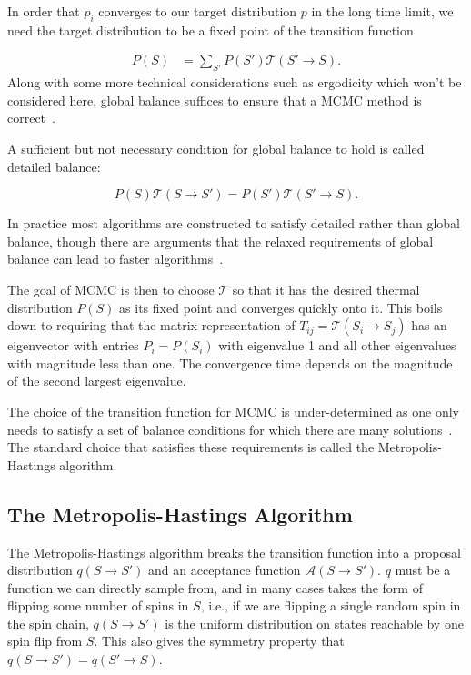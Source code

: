 In order that \(p_i\) converges to our target distribution \(p\) in the long time limit, we need the target distribution to be a fixed point of the transition function

\[\begin{aligned}
P(S) &= \sum_{S'} P(S') \mathcal{T}(S' \rightarrow S).
\end{aligned}
\] Along with some more technical considerations such as ergodicity which won't be considered here, global balance suffices to ensure that a MCMC method is correct~\autocite{kellyReversibilityStochasticNetworks1981}.

A sufficient but not necessary condition for global balance to hold is called detailed balance:

\[
P(S) \mathcal{T}(S \rightarrow S') = P(S') \mathcal{T}(S' \rightarrow S).
\]

In practice most algorithms are constructed to satisfy detailed rather than global balance, though there are arguments that the relaxed requirements of global balance can lead to faster algorithms~\autocite{kapferSamplingPolytopeHarddisk2013}.

The goal of MCMC is then to choose \(\mathcal{T}\) so that it has the desired thermal distribution \(P(S)\) as its fixed point and converges quickly onto it. This boils down to requiring that the matrix representation of \(T_{ij} = \mathcal{T}(S_i \to S_j)\) has an eigenvector with entries \(P_i = P(S_i)\) with eigenvalue 1 and all other eigenvalues with magnitude less than one. The convergence time depends on the magnitude of the second largest eigenvalue.

The choice of the transition function for MCMC is under-determined as one only needs to satisfy a set of balance conditions for which there are many solutions~\autocite{kellyReversibilityStochasticNetworks1981}. The standard choice that satisfies these requirements is called the Metropolis-Hastings algorithm.

\hypertarget{the-metropolis-hastings-algorithm}{%
\subsection{The Metropolis-Hastings Algorithm}\label{the-metropolis-hastings-algorithm}}

The Metropolis-Hastings algorithm breaks the transition function into a proposal distribution \(q(S \to S')\) and an acceptance function \(\mathcal{A}(S \to S')\). \(q\) must be a function we can directly sample from, and in many cases takes the form of flipping some number of spins in \(S\), i.e., if we are flipping a single random spin in the spin chain, \(q(S \to S')\) is the uniform distribution on states reachable by one spin flip from \(S\). This also gives the symmetry property that \(q(S \to S') = q(S' \to S)\).

